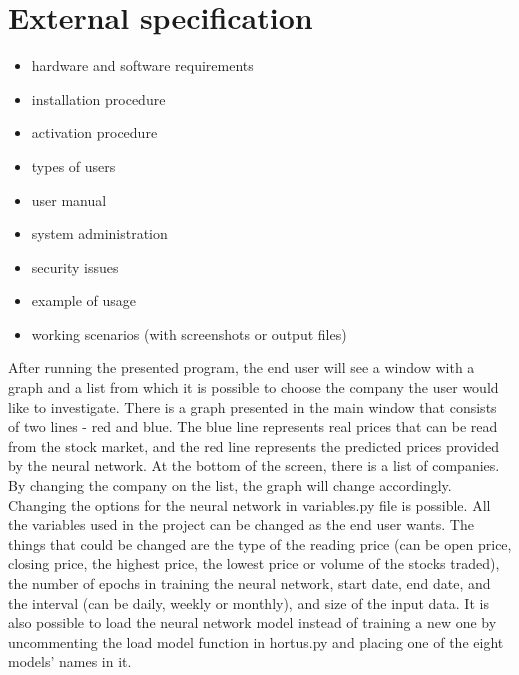 \chapter{External specification}
\begin{itemize}
\item hardware and software requirements
\item installation procedure
\item activation procedure
\item types of users
\item user manual
\item system administration
\item security issues
\item example of usage
\item working scenarios (with screenshots or output files)
\end{itemize}

After running the presented program, the end user will see a window with a graph and a list from which it is possible to choose the company the user would like to investigate. There is a graph presented in the main window that consists of two lines - red and blue. The blue line represents real prices that can be read from the stock market, and the red line represents the predicted prices provided by the neural network. At the bottom of the screen, there is a list of companies. By changing the company on the list, the graph will change accordingly.
Changing the options for the neural network in variables.py file is possible. All the variables used in the project can be changed as the end user wants. The things that could be changed are the type of the reading price (can be open price, closing price, the highest price, the lowest price or volume of the stocks traded), the number of epochs in training the neural network, start date, end date, and the interval (can be daily, weekly or monthly), and size of the input data.
It is also possible to load the neural network model instead of training a new one by uncommenting the load model function in hortus.py and placing one of the eight models' names in it.

